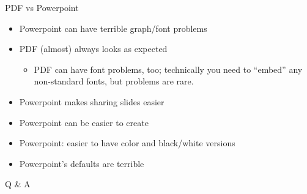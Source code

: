 \documentclass[12pt]{article}
\newcommand{\headsize}{\fontsize{35}{35} \selectfont}
\newcommand{\smallsize}{\fontsize{25}{30} \selectfont}
\newcommand{\smallestsize}{\fontsize{18}{22} \selectfont}
\begin{document}
\newpage

\headsize \color{myyellow}
\hfill \begin{minipage}{5.75in}
\centering
PDF vs Powerpoint
\end{minipage}

\vspace{3cm} \color{mywhite} \smallsize

\hfill \begin{minipage}{9.5in}

\begin{itemize}
\itemsep18pt
\item Powerpoint can have terrible graph/font problems

\item PDF (almost) always looks as expected
{\color{myblue} \smallestsize
\begin{itemize}
\item PDF can have font problems, too; technically you need to
  ``embed'' any non-standard fonts, but problems are rare.
\end{itemize} }

\item Powerpoint makes sharing slides easier

\item Powerpoint can be easier to create

\item Powerpoint: easier to have color and black/white versions

\item Powerpoint's defaults are terrible

\end{itemize}

\end{minipage}




\newpage

\headsize \color{myyellow}
\hfill \begin{minipage}{5.75in}
\centering
Q \& A
\end{minipage}

\vspace{3cm} \color{mywhite} \smallsize
\end{document}

